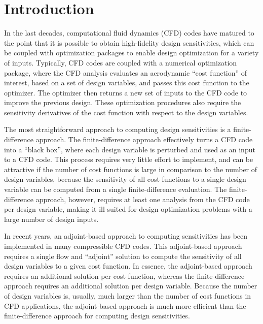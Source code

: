 \chapter{Introduction}
\label{chapter-one}

In the last decades, computational fluid dynamics (CFD) codes have matured to
the point that it is possible to obtain high-fidelity design sensitivities,
which can be coupled with optimization packages to enable design optimization
for a variety of inputs\cite{baysal1992aerodynamic, balagangadhar2001design}.
Typically, CFD codes are coupled with a numerical optimization
package\cite{SNOPT-alg, KSOPT, fletcher1963rapidly, npsol-manual}, where the CFD
analysis evaluates an aerodynamic ``cost function'' of interest, based on a set
of design variables, and passes this cost function to the optimizer.  The
optimizer then returns a new set of inputs to the CFD code to improve the
previous design.  These optimization procedures also require the sensitivity
derivatives of the cost function with respect to the design variables.  

The most straightforward approach to computing design sensitivities is a
finite-difference approach.  The finite-difference approach effectively turns a
CFD code into a ``black box'', where each design variable is perturbed and used
as an input to a CFD code.  This process requires very little effort to
implement, and can be attractive if the number of cost functions is large in
comparison to the number of design variables, because the sensitivity of all
cost functions to a single design variable can be computed from a single
finite-difference evaluation.  The finite-difference approach, however, requires
at least one analysis from the CFD code per design variable, making it
ill-suited for design optimization problems with a large number of design
inputs.

In recent years, an adjoint-based approach to computing sensitivities has been
implemented in many compressible CFD codes\cite{mavriplis-2006,
nemec-aftosmis-adjoint, nielsen2002recent, reuther1999constrained}. This
adjoint-based approach requires a single flow and ``adjoint'' solution to
compute the sensitivity of all design variables to a given cost function.
In essence, the adjoint-based approach requires an additional solution per cost
function, whereas the finite-difference approach requires an additional solution
per design variable.  Because the number of design variables is, usually, much
larger than the number of cost functions in CFD applications, the adjoint-based
approach is much more efficient than the finite-difference approach for
computing design sensitivities.


